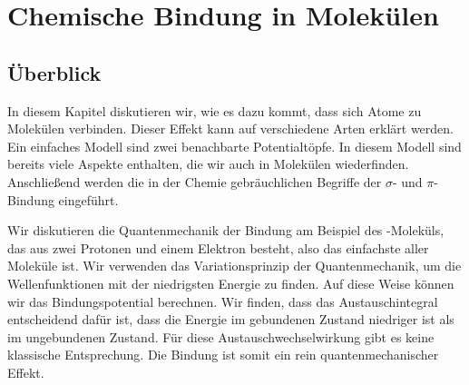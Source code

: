 \renewcommand{\lastmod}{16. Dezember 2025} 
\renewcommand{\chapterauthors}{Markus Lippitz}

\chapter{Chemische Bindung in Molekülen}












\section{Überblick}

In diesem Kapitel diskutieren wir, wie es dazu kommt, dass sich Atome zu Molekülen verbinden. Dieser Effekt kann auf verschiedene Arten erklärt werden. Ein einfaches Modell sind zwei benachbarte Potentialtöpfe. In diesem Modell sind bereits viele Aspekte enthalten, die wir auch in Molekülen wiederfinden. Anschließend werden die in der Chemie gebräuchlichen Begriffe der $\sigma$- und $\pi$-Bindung eingeführt.
 
Wir diskutieren die Quantenmechanik der Bindung am Beispiel des -Moleküls, das aus zwei Protonen und einem Elektron besteht, also das einfachste aller Moleküle ist. Wir verwenden das Variationsprinzip der Quantenmechanik, um die Wellenfunktionen mit der niedrigsten Energie zu finden. Auf diese Weise können wir das Bindungspotential berechnen. Wir finden, dass das Austauschintegral entscheidend dafür ist, dass die Energie im gebundenen Zustand niedriger ist als im ungebundenen Zustand. Für diese Austauschwechselwirkung gibt es keine klassische Entsprechung. Die Bindung ist somit ein rein quantenmechanischer Effekt.

